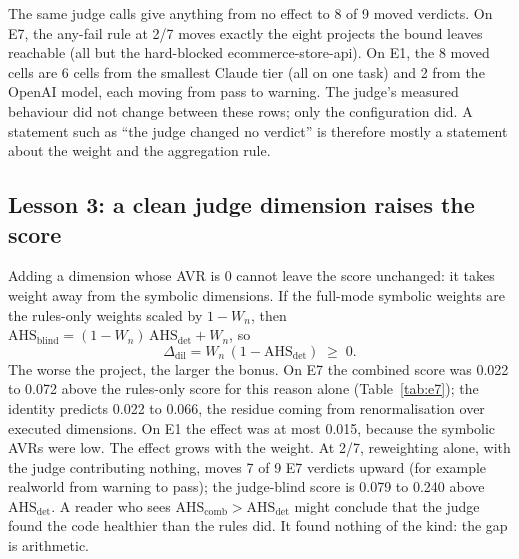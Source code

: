 \documentclass[10pt,a4paper]{article}
\newcommand{\Wn}{W_n}
\newcommand{\ahs}[1]{\mathrm{AHS}_{\mathrm{#1}}}
\begin{document}
The same judge calls give anything from no effect to 8 of 9 moved verdicts. On E7, the any-fail rule at 2/7 moves
exactly the eight projects the bound leaves reachable (all but the hard-blocked ecommerce-store-api). On E1, the 8
moved cells are 6 cells from the smallest Claude tier (all on one task) and 2 from the OpenAI model, each moving from
pass to warning.
The judge's measured behaviour did not change between these rows; only the configuration did. A statement such as
``the judge changed no verdict'' is therefore mostly a statement about the weight and the aggregation rule.

\subsection{Lesson 3: a clean judge dimension raises the score}\label{sec:l3}

Adding a dimension whose AVR is 0 cannot leave the score unchanged: it takes weight away from the symbolic
dimensions. If the full-mode symbolic weights are the rules-only weights scaled by $1-\Wn$, then
$\ahs{blind} = (1-\Wn)\,\ahs{det} + \Wn$, so
\begin{equation}\label{eq:dil}
  \Delta_{\mathrm{dil}} = \Wn\,(1 - \ahs{det}) \;\geq\; 0 .
\end{equation}
The worse the project, the larger the bonus. On E7 the combined score was 0.022 to 0.072 above the rules-only score
for this reason alone (Table~\ref{tab:e7}); the identity predicts 0.022 to 0.066, the residue coming from
renormalisation over executed dimensions. On E1 the effect was at most 0.015, because the symbolic AVRs were low.
The effect grows with the weight. At 2/7, reweighting alone, with the judge contributing nothing, moves 7 of 9 E7
verdicts upward (for example realworld from warning to pass); the judge-blind score is 0.079 to 0.240 above
$\ahs{det}$.
A reader who sees $\ahs{comb} > \ahs{det}$ might conclude that the judge found the code healthier than the rules
did. It found nothing of the kind: the gap is arithmetic.
\end{document}
